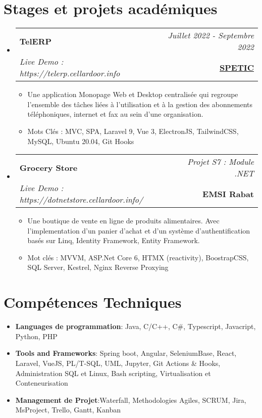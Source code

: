 \documentclass[a4paper,11pt]{article}
\makeatletter
\newcommand{\resumeItem}[2]{
  \item{
    \textbf{#1}{:\hspace{0.5mm}#2 \vspace{-0.5mm}}
  }
}
\newcommand{\resumeProject}[4]{
\vspace{0.5mm}\item
    \begin{tabular*}{0.98\textwidth}[t]{l@{\extracolsep{\fill}}r}
        \textbf{#1} & \textit{\footnotesize{#3}} \\
        \footnotesize{\textit{#2}} & \footnotesize{#4}
    \end{tabular*}
    \vspace{-2.4mm}
}
\newcommand{\resumeSubItem}[2]{\resumeItem{#1}{#2}\vspace{-4pt}}
\newcommand{\resumeSubHeadingListStart}{\begin{itemize}[leftmargin=*,labelsep=0mm]}
\newcommand{\resumeHeadingSkillStart}{\begin{itemize}[leftmargin=*,itemsep=1.7mm, rightmargin=2ex]}
\newcommand{\resumeItemListStart}{\begin{justify}\begin{itemize}[leftmargin=3ex, rightmargin=2ex, noitemsep,labelsep=1.2mm,itemsep=0mm]\small}
\newcommand{\resumeSubHeadingListEnd}{\end{itemize}\vspace{2mm}}
\newcommand{\resumeHeadingSkillEnd}{\end{itemize}\vspace{-2mm}}
\newcommand{\resumeItemListEnd}{\end{itemize}\end{justify}\vspace{-2mm}}
\makeatother
\begin{document}
\section{\textbf{Stages et projets académiques}}
\resumeSubHeadingListStart 
    \resumeProject
      {TelERP} 
      {Live Demo : https://telerp.cellardoor.info}
      {Juillet 2022 - Septembre 2022} 
      {\href{https://telerp.cellardoor.info}{\textbf{SPETIC}}}
        \vspace{-2mm}
      \resumeItemListStart
        \item {Une application Monopage Web et Desktop centralisée qui regroupe l'ensemble des tâches liées à l'utilisation et à la gestion des abonnements téléphoniques, internet et fax au sein d'une organisation.}
        \item {Mots Clés : MVC, SPA, Laravel 9, Vue 3, ElectronJS, TailwindCSS, MySQL, Ubuntu 20.04, Git Hooks}
      \resumeItemListEnd
      \vspace{-3mm}
    \resumeProject
      {Grocery Store} 
    {Live Demo : https://dotnetstore.cellardoor.info/}
      {Projet S7 : Module .NET} 
      {{\textbf{EMSI Rabat}}}
    \vspace{-2mm}
      \resumeItemListStart
        \item {Une boutique de vente en ligne de produits alimentaires. Avec l'implementation d'un panier d'achat et d'un système d'authentification basés sur Linq, Identity Framework, Entity Framework.}
        \item {Mot clés : MVVM, ASP.Net Core 6, HTMX (reactivity), BoostrapCSS, SQL Server, Kestrel, Nginx Reverse Proxying }
      \resumeItemListEnd
     \vspace{-2mm}
\resumeSubHeadingListEnd
\vspace{-7mm}

\section{\textbf{Compétences Techniques}}
 \resumeHeadingSkillStart
  \resumeSubItem{Languages de programmation} 
    { Java, C/C++, C\#, Typescript, Javacript, Python, PHP}
    \vspace{-0.5mm} 
 \resumeSubItem{Tools and Frameworks} 
    { Spring boot, Angular, SeleniumBase, React, Laravel, VueJS, PL/T-SQL, UML, Jupyter, Git Actions \& Hooks, Administration SQL et Linux, Bash scripting, Virtualisation et Conteneurisation} 
    \vspace{-0.5mm} 
    \resumeSubItem{Management de Projet} 
    {Waterfall, Methodologies Agiles, SCRUM, Jira, MsProject, Trello, Gantt, Kanban} 
    \vspace{-0.5mm} 
 \resumeHeadingSkillEnd
\vspace{-2mm}
\end{document}

